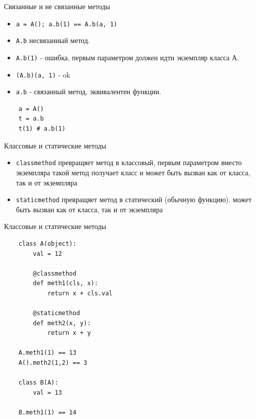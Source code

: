 \documentclass{article}
\begin{document}
\begin{center} Связанные и не связанные методы \end{center}
\begin{itemize}
    \item \lstinline!a = A(); a.b(1) == A.b(a, 1)!
    \item \lstinline!A.b! несвязанный метод. 
    \item \lstinline!A.b(1)! - ошибка, первым параметром должен идти экземпляр класса А. 
    \item \lstinline!(A.b)(a, 1)! - ok
    \item \lstinline!a.b! - связанный метод, эквивалентен функции.
\end{itemize}
\vspace{15pt}
\begin{lstlisting}
    a = A()
    t = a.b
    t(1) # a.b(1)
\end{lstlisting}
\newpage

\begin{center} Классовые и статические методы \end{center}
\begin{itemize}
    \item \lstinline!classmethod! превращяет метод в классовый, первым параметром вместо
          экземпляра такой метод получает класс и может быть вызван как от класса, 
          так и от экземпляра
    \item \lstinline!staticmethod! превращяет метод в статический (обычную функцию).
          может быть вызван как от класса, 
          так и от экземпляра
\end{itemize}
\newpage

\begin{center} Классовые и статические методы \end{center}
\begin{lstlisting}
    class A(object):
        val = 12

        @classmethod
        def meth1(cls, x):
            return x + cls.val

        @staticmethod
        def meth2(x, y):
            return x + y

    A.meth1(1) == 13
    A().meth2(1,2) == 3 

    class B(A):
        val = 13

    B.meth1(1) == 14
\end{lstlisting}
\newpage
\end{document}
